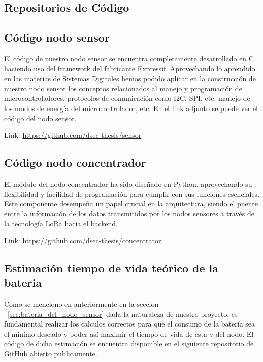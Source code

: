 \clearpage

\begin{appendixd}
    \section{Repositorios de Código}
        \subsection{Código nodo sensor}{\label{codigo_sensor}}
            El código de nuestro nodo sensor se encuentra completamente desarrollado en C haciendo uso del framework del fabricante
            Expressif. Aprovechando lo aprendido en las materias de Sistemas Digitales hemos podido aplicar en la construcción de nuestro
            nodo sensor los conceptos relacionados al manejo y programación de microcontroladores, protocolos de comunicación como I2C, SPI, etc.
            manejo de los modos de energía del microcontrolador, etc. En el link adjunto se puede ver el código del nodo sensor.


            Link: \url{https://github.com/dsec-thesis/sensor}

        \subsection{Código nodo concentrador}{\label{codigo_concentrador}}
            El módulo del nodo concentrador ha sido diseñado en Python, aprovechando su 
            flexibilidad y facilidad de programación para cumplir con sus funciones esenciales.
            Este componente desempeña un papel crucial en la arquitectura, siendo el puente entre 
            la información de los datos transmitidos por los nodos sensores a través de la tecnología
            LoRa hacia el backend.


            Link: \url{https://github.com/dsec-thesis/concentrator}

        \subsection{Estimación tiempo de vida teórico de la bateria}{\label{codigo_estimacion_bateria}}
            Como se menciono en anteriormente en la seccion ~\ref{sec:bateria_del_nodo_sensor} dada la naturaleza de nuestro
            proyecto, es fundamental realizar los calculos correctos para que el consumo de la batería sea el minímo deseado 
            y poder así maximir el tiempo de vida de esta y del nodo. El código de dicha estimación se encuentra disponible
            en el siguiente repositorio de GitHub abierto publicamente.


\end{appendixd}
